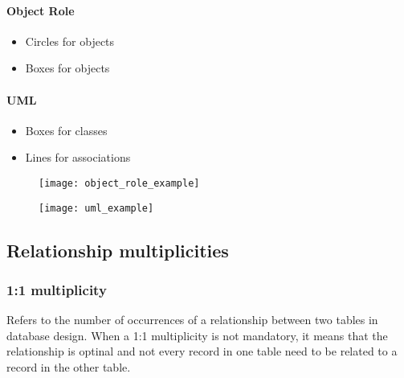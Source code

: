 %
\begin{minipage}[t]{0.48\textwidth}
\paragraph*{Object Role}
\begin{itemize}
    \item Circles for objects
    \item Boxes for objects
\end{itemize}
\end{minipage}
\hfill
\begin{minipage}[t]{0.48\textwidth}
\paragraph*{UML}
\begin{itemize}
    \item Boxes for classes
    \item Lines for associations
\end{itemize}
\end{minipage}

\begin{minipage}{0.48\textwidth}
\begin{figure}[H]
    \centering
    \texttt{[image: object\_role\_example]}
\end{figure}
\end{minipage}
\hfill
\begin{minipage}{0.48\textwidth}
\begin{figure}[H]
    \centering
    \texttt{[image: uml\_example]}
\end{figure}
\end{minipage}

\newpage
\subsection{Relationship multiplicities}

\subsubsection{1:1 multiplicity}

Refers to the number of occurrences of a relationship between two tables in database design. When a 1:1 multiplicity is not mandatory, it means that the relationship is optinal and not every record in one table need to be related to a record in the other table.

